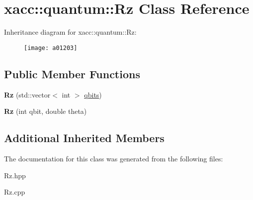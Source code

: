 \hypertarget{a01203}{}\section{xacc\+:\+:quantum\+:\+:Rz Class Reference}
\label{a01203}
Inheritance diagram for xacc\+:\+:quantum\+:\+:Rz\+:\begin{figure}[H]
\begin{center}
\leavevmode
\texttt{[image: a01203]}
\end{center}
\end{figure}
\subsection*{Public Member Functions}
\begin{DoxyCompactItemize}
\item 
\mbox{\label{a01203_a7ce912c7f9c9e8f4e7e60f9dba95538b}} 
{\bfseries Rz} (std\+::vector$<$ int $>$ \hyperlink{a01159_a2a56be6c2519ea65df4d06f4abae1393}{qbits})
\item 
\mbox{\label{a01203_ae30eaf75feb8f896c22043629d21b834}} 
{\bfseries Rz} (int qbit, double theta)
\end{DoxyCompactItemize}
\subsection*{Additional Inherited Members}


The documentation for this class was generated from the following files\+:\begin{DoxyCompactItemize}
\item 
Rz.\+hpp\item 
Rz.\+cpp\end{DoxyCompactItemize}
